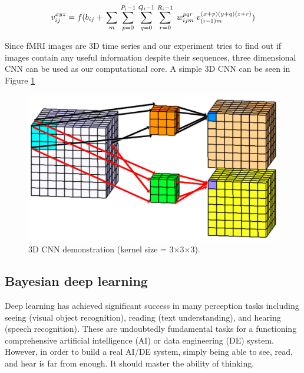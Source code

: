 \documentclass[a4paper,fleqn]{cas-dc}
\begin{document}
\begin{equation}
v^{ xyz }_{ ij } = \\
f(  \\
b_{ij} +  \\
\sum_m \\ 
\sum_{p=0}^{P_i-1} \\
\sum_{q=0}^{Q_i-1} \\
\sum_{r=0}^{R_i-1} \\
\; w^{pqr}_{ijm}  \\
\; v ^ { (x+p)(y+q)(z+r) }_{ (i-1)m } \\
) \label{eq:CnnVal} 
\end{equation}

Since fMRI images are 3D time series and our experiment tries to find out if images contain any useful information despite their sequences, three dimensional CNN can be used as our computational core. A simple 3D CNN can be seen in Figure \ref{fig:CnnSample}

\begin{figure}
	\begin{center}
	\includegraphics[width=0.8\linewidth]{images/3dCnn}
	\end{center}
	\caption{3D CNN demonstration (kernel size = 3$\times$3$\times$3).}
	\label{fig:CnnSample}
\end{figure}




\subsection{Bayesian deep learning}
\label{section:bayesianDL}
Deep learning has achieved significant success in many perception tasks including seeing (visual object recognition), reading (text understanding), and hearing (speech recognition). These are undoubtedly fundamental tasks for a functioning comprehensive artificial intelligence (AI) or data engineering (DE) system. However, in order to build a real AI/DE system, simply being able to see, read, and hear is far from enough. It should master
the ability of thinking.
\end{document}
